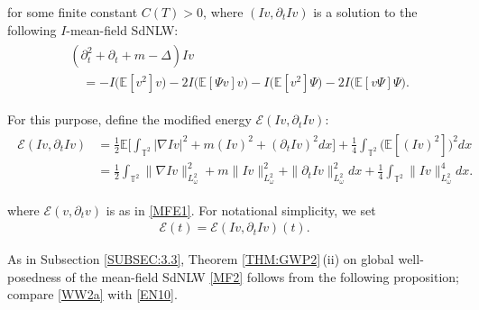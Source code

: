 \documentclass[letterpaper, 11pt,  reqno]{amsart}
\newcommand{\1}{\hspace{0.5mm}\text{I}\hspace{0.2mm}}
\newcommand{\noi}{\noindent}
\newcommand{\T}{\mathbb{T}}
\newcommand{\E}{\mathbb{E}}
\newcommand{\dt}{\partial_t}
\newcommand{\nb}{\nabla}
\newcommand{\EE}{\mathcal{E}}
\renewcommand{\o}{\omega}
\numberwithin{equation}{section}
\numberwithin{theorem}{section}
\begin{document}
\noi
for some  finite constant $C(T) > 0$, 
where $(I v , \dt I v )$ is a solution to the following
$I$-mean-field SdNLW:
\begin{align} 
\begin{split}
& (\dt^2 + \dt + m - \Delta) I v \\
& \quad = 
 - I\big( \E [ v^2 ] v\big)
 - 2 I \big(\E [ \Psi v ] v\big) -I \big( \E [ v^2 ] \Psi\big)
- 2 I \big(\E [ v \Psi  ] \Psi\big).
\end{split}
\label{WN1a} 
\end{align} 


\noi
For this purpose, define
the modified energy 
$\EE (I v, \dt I v) $:
\begin{align}
\begin{split}
\EE (I v, \dt I v) 
& = 
\frac 12 \E \bigg[ \int_{\T^2} 
|\nb I v|^2  + m (Iv)^2 +  (\dt Iv)^2 d x \bigg] + \frac 14 \int_{\T^2} \big(\E [(Iv)^2]\big)^2 d x\\
& = 
\frac 12  \int_{\T^2} 
\|\nb I v\|_{L^2_\o}^2  + m \|Iv\|_{L^2_\o}^2 +  \|\dt Iv\|_{L^2_\o}^2 d x  + \frac 14 \int_{\T^2} 
\|Iv\|_{L^2_\o}^4 d x.
\end{split}
\label{WW1}
\end{align}


\noi
where 
$\EE(v, \dt v)$ is as in  \eqref{MFE1}.
For notational simplicity, we set 
\begin{align*}
\EE(t) = \EE (I v, \dt I v) (t).
\end{align*}


\noi
As in Subsection \ref{SUBSEC:3.3}, 
Theorem \ref{THM:GWP2}\,(ii) on global well-posedness
of the mean-field SdNLW \eqref{MF2} follows
from the following proposition;
compare \eqref{WW2a} with \eqref{EN10}.
\end{document}
